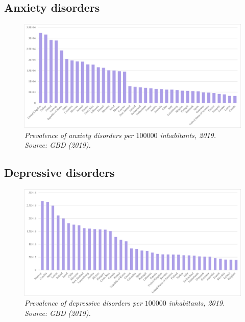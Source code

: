         \subsection{Anxiety disorders}
        \begin{figure}  %
            \centering
            \includegraphics[width=\textwidth]{GRAPHS/1MH_anxietydisordersOECDprevalence100k2019.png}
            \caption{\emph{Prevalence of anxiety disorders per $100 000$ inhabitants, 2019.
            Source: GBD (2019).}}
            \label{fig:anxiety_OECD}
        \end{figure}

        \subsection{Depressive disorders}

        \begin{figure}  %
            \centering
            \includegraphics[width=\textwidth]{GRAPHS/1MH_depressivedisordersOECDprevalence100k2019.png}
            \caption{\emph{Prevalence of depressive disorders per $100 000$ inhabitants, 2019. 
            Source: GBD (2019).}}
            \label{fig:depression_OECD}
        \end{figure}




